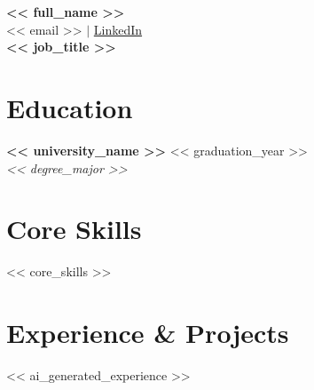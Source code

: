 \documentclass[11pt, letterpaper]{article}
\begin{document}
\begin{center}
    {\Huge \textbf{<< full_name >>}} \\
    \vspace{2mm}
    << email >> $|$ \href{<< linkedin_url >>}{LinkedIn} \\
    \vspace{2mm}
    {\large \textbf{<< job_title >>}}
\end{center}

\vspace{4mm}

\section*{Education}
\noindent \textbf{<< university_name >>} \hfill << graduation_year >> \\
\textit{<< degree_major >>}

\vspace{4mm}

\section*{Core Skills}
\noindent << core_skills >>

\vspace{4mm}

\section*{Experience \& Projects}
<< ai_generated_experience >>
\end{document}
